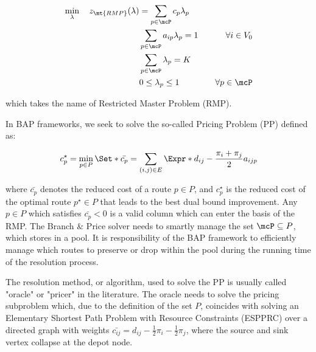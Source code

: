 \begin{align}
	\min_{\lambda} \quad z_\mt{RMP}(\lambda) & = \sum_{p \in \mcP}  c_p \lambda_p \label{eq:rmp-obj-func}                                                                                                                              \\
	                                         & \sum_{p \in \mcP}  a_{ip} \lambda_p = 1                    & \quad \forall i \in V_0                                              \label{eq:rmp-customers-visited-by-exactly-one-route} \\
	                                         & \sum_{p \in \mcP} \lambda_{p} = K\label{eq:rmp-K-routes}                                                                                                                                \\
	                                         & 0 \le \lambda_p \le 1                                      & \quad \forall p \in \mcP \label{eq:rmp-lambda-mip-var-bounds}
\end{align}

which takes the name of Restricted Master Problem (RMP).

In BAP frameworks, we seek to solve the so-called Pricing Problem (PP) defined as:

\begin{equation}
	{c^\star_p} = \min_{p \in P} \Set*{ \bar{c_p} = \sum_{(i, j) \in E} \Expr*{d_{ij} - \frac{\pi_i + \pi_j}{2}} a_{ijp}  }
\end{equation}

where $\bar{c_p}$ denotes the reduced cost of a route $p \in P$, and $c^\star_p$ is the reduced cost of the optimal route $p^\star \in P$ that leads to the best dual bound improvement.
Any $p \in P$ which satisfies $\bar{c_p} < 0$ is a valid column which can enter the basis of the RMP.
The Branch \& Price solver needs to smartly manage the set $\mcP \subseteq P$, which stores in a pool.
It is responsibility of the BAP framework to efficiently manage which routes to preserve or drop within the pool during the running time of the resolution process.

The resolution method, or algorithm, used to solve the PP is usually called "oracle" or "pricer" in the literature.
The oracle needs to solve the pricing subproblem which, due to the definition of the set $P$, coincides with solving an Elementary Shortest Path Problem with Resource Constraints (ESPPRC) over a directed graph with weights $\bar{c_{ij}} = d_{ij} - \frac{1}{2} \pi_i - \frac{1}{2} \pi_j$, where the source and sink vertex collapse at the depot node.

